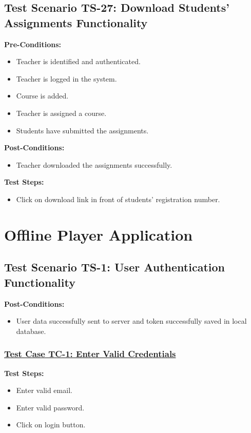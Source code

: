 \subsection{Test Scenario TS-27: Download Students' Assignments Functionality}
\textbf{Pre-Conditions: }
\begin{itemize}

\item Teacher is identified and authenticated.
\item Teacher is logged in the system.
\item Course is added.
\item Teacher is assigned a course.
\item Students have submitted the assignments.

\end{itemize}

\textbf{Post-Conditions: }
\begin{itemize}
\item Teacher downloaded the assignments successfully.

\end{itemize}
\textbf{Test Steps:}
\begin{itemize}

\item Click on download link in front of students' registration number.

\end{itemize}

\section{Offline Player Application}
\subsection{Test Scenario TS-1: User Authentication Functionality}

\textbf{Post-Conditions: }
\begin{itemize}
\item User data successfully sent to server and token successfully saved in local database.
\end{itemize}
\subsubsection{\underline{Test Case TC-1: Enter Valid Credentials}}
\textbf{Test Steps:}
\begin{itemize}

\item Enter valid email.
\item Enter valid password.
\item Click on login button.

\end{itemize}


